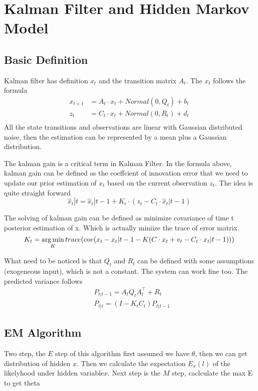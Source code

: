 \section{Kalman Filter and Hidden Markov Model}

\subsection{Basic Definition}
Kalman filter has definition $x_t$ and the transition matrix $A_t$. The $x_t$ follows the formula
\begin{equation}
  \begin{aligned}
    x_{t+1} &= A_t \cdot x_t + Normal(0, Q_t) + b_t\\
    z_{t} &= C_t \cdot x_t + Normal(0, R_t) + d_t\\
  \end{aligned}
\end{equation}
All the state transitions and observations are linear with Gaussian distributed noise, then the
estimation can be represented by a mean plus a Gaussian distribution.

The kalman gain is a critical term in Kalman Filter. In the formula above, kalman gain can be defined as the {\color{blue}coeffcient of
innovation error that we need to update our prior estimation of $x_t$ }based on the current observation $z_t$. The idea is quite
straight forward  $$\hat{x}_t|t = \hat{x}_t|t-1 + K_t \cdot (z_t - C_t \cdot \hat{x}_t|t-1)$$

The solving of kalman gain can be defined as minimize covariance of time t posterior estimation of x. Which is actually miniize the trace of error matrix.
\begin{equation}
K_t = \operatorname*{arg\,min}_K trace( cov(x_t - x_t|t-1 - K(C \cdot x_t + v_t - C_t \cdot x_t|t-1)))
\end{equation}

What need to be noticed is that $Q_t$ and $R_t$ can be defined with some assumptions (exogeneous input), which is not a constant. The system can work fine too. The predicted variance follows
\begin{equation}
  \begin{aligned}
    &P_{t|t-1} = A_t Q_t A_t^\top + R_t \\
    &P_{t|t} = (I - K_t C_t) P_{t|t-1}
  \end{aligned}
\end{equation}

\subsection{EM Algorithm}
Two step, the $E$ step of this algorithm first assumed we have $\theta$, then we can get distribution of hidden $x$. Then we calculate the expectation $E_{x}(l)$ of the likelyhood under hidden variable$x$.
Next step is the $M$ step, caclculate the max E to get theta

